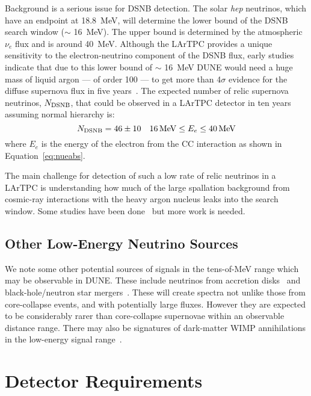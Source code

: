 Background is a serious issue for DSNB detection.
The solar {\em hep} neutrinos, which have an                
endpoint at \SI{18.8}{\MeV}, will determine the lower bound of the DSNB
search window ($\sim$ \SI{16}{\MeV}).  The upper bound is determined
by the atmospheric ${\nu}_{e}$ flux and
is around \SI{40}{MeV}.
Although the LArTPC provides a unique sensitivity to the
electron-neutrino component of the DSNB flux, early studies indicate
that due to this lower bound of $\sim$ \SI{16}{\MeV} DUNE would need a huge
mass of liquid argon --- of order \SI{100}{\kt} --- to get more than 4$\sigma$
evidence for the diffuse supernova flux in five
years~\cite{Cocco:2004ac}.
%
The expected number of relic
supernova neutrinos, $N_{\rm DSNB}$, that could be observed in a
 LArTPC detector in ten years~\cite{Cocco:2004ac}
assuming normal hierarchy is:
\begin{equation}
N_{\rm DSNB} = 46 \pm 10  \ \ \ 16 \, {\rm MeV} \leq E_e \leq 40 \, {\rm MeV}
\label{eqn:srnrate}
\end{equation}
where $E_e$ is the energy of the electron from the CC interaction as
shown in Equation~\ref{eq:nueabs}. 

 The main challenge for detection of such
a low rate of relic neutrinos in a LArTPC is understanding how much of
the large spallation background from cosmic-ray interactions with the
heavy argon nucleus 
leaks into the search window.   Some studies have been done~\cite{Barker:2012nb} but more work is needed.

\subsection{Other Low-Energy Neutrino Sources}

We note some other potential sources of signals in the tens-of-MeV range which may be observable in DUNE.  These include neutrinos from accretion disks~\cite{Caballero:2011dw} and black-hole/neutron star mergers~\cite{Caballero:2009ww}.  These will create spectra not unlike those from core-collapse events, and with potentially large fluxes.  However they are expected to be considerably rarer than core-collapse supernovae within an observable distance range.  There may also be signatures of dark-matter WIMP annihilations in the low-energy signal range~\cite{Rott:2012qb, Bernal:2012qh}.



\section{Detector Requirements}
\label{sec:physics-snblowe-detector-requirements}

